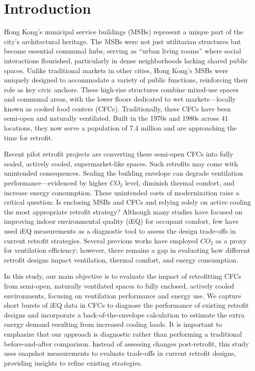 \documentclass[preprint,12pt]{elsarticle}
\begin{document}
\section{Introduction}
Hong Kong’s municipal service buildings (MSBs) represent a unique part of the city’s architectural heritage. The MSBs were not just utilitarian structures but became essential communal hubs, serving as “urban living rooms” where social interactions flourished, particularly in dense neighborhoods lacking shared public spaces. Unlike traditional markets in other cities, Hong Kong’s MSBs were uniquely designed to accommodate a variety of public functions, reinforcing their role as key civic anchors. These high-rise structures combine mixed-use spaces and communal areas, with the lower floors dedicated to wet markets—locally known as cooked food centers (CFCs). Traditionally, these CFCs have been semi‑open and naturally ventilated. Built in the 1970s and 1980s across 41 locations\cite{2}, they now serve a population of 7.4 million and are approaching the time for retrofit.

Recent pilot retrofit projects are converting these semi-open CFCs into fully sealed, actively cooled, supermarket-like spaces. Such retrofits may come with unintended consequences. Sealing the building envelope can degrade ventilation performance—evidenced by higher $CO_2$ level, diminish thermal comfort, and increase energy consumption. These unintended costs of modernization raise a critical question: Is enclosing MSBs and CFCs and relying solely on active cooling the most appropriate retrofit strategy? Although many studies have focused on improving indoor environmental quality (iEQ) for occupant comfort, few have used iEQ measurements as a diagnostic tool to assess the design trade-offs in current retrofit strategies. Several previous works have employed $CO_2$ as a proxy for ventilation efficiency\cite{23,24,25}; however, there remains a gap in evaluating how different retrofit designs impact ventilation, thermal comfort, and energy consumption. 

In this study, our main objective is to evaluate the impact of retrofitting CFCs from semi-open, naturally ventilated spaces to fully enclosed, actively cooled environments, focusing on ventilation performance and energy use\cite{5,6}. We capture short bursts of iEQ data in CFCs to diagnose the performance of existing retrofit designs and incorporate a back-of-the-envelope calculation to estimate the extra energy demand resulting from increased cooling loads. It is important to emphasize that our approach is diagnostic rather than performing a traditional before-and-after comparison. Instead of assessing changes post-retrofit, this study uses snapshot measurements to evaluate trade-offs in current retrofit designs, providing insights to refine existing strategies.
\end{document}
